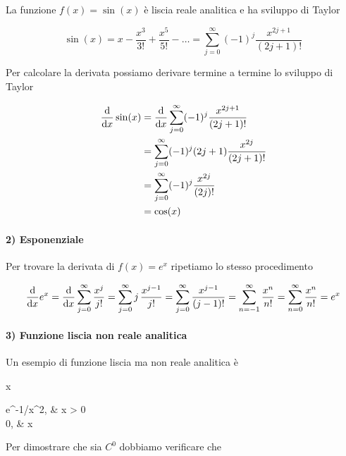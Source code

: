 La funzione $ f (x) = \sin(x) $ è liscia reale analitica e ha sviluppo di Taylor

\begin{equation}
	\sin(x) = x - \dfrac{x^{3}}{3!} + \dfrac{x^{5}}{5!} - \dots %
	= \sum_{j=0}^{\infty} (-1)^{j} \dfrac{x^{2j+1}}{(2j+1)!}
\end{equation}

Per calcolare la derivata possiamo derivare termine a termine lo sviluppo di Taylor

\begin{align}
	\begin{split}
		\dv{x} \sin(x) &= \dv{x} \sum_{j=0}^{\infty} (-1)^{j} \dfrac{x^{2j+1}}{(2j+1)!} \\
		&= \sum_{j=0}^{\infty} (-1)^{j} (2j+1) \dfrac{x^{2j}}{(2j+1)!} \\
		&= \sum_{j=0}^{\infty} (-1)^{j} \dfrac{x^{2j}}{(2j)!} \\
		&= \cos(x)
	\end{split}
\end{align}

\paragraph{2) Esponenziale}

Per trovare la derivata di $ f(x) = e^{x} $ ripetiamo lo stesso procedimento

\begin{equation}
	\dv{x} e^{x} = \dv{x} \sum_{j=0}^{\infty}\dfrac{x^{j}}{j!} %
	= \sum_{j=0}^{\infty} j \, \dfrac{x^{j-1}}{j!} %
	= \sum_{j=0}^{\infty} \dfrac{x^{j-1}}{(j-1)!} %
	= \sum_{n=-1}^{\infty} \dfrac{x^{n}}{n!} %
	= \sum_{n=0}^{\infty} \dfrac{x^{n}}{n!} %
	= e^{x}
\end{equation}

\paragraph{3) Funzione liscia non reale analitica}

Un esempio di funzione liscia ma non reale analitica è

	{\R}{\R}
	{x}{%
		\begin{cases}
			e^{-1/x^{2}}, &  x > 0 \\
			0, &  x 
		\end{cases}
		}

Per dimostrare che sia $ C^{0} $ dobbiamo verificare che

